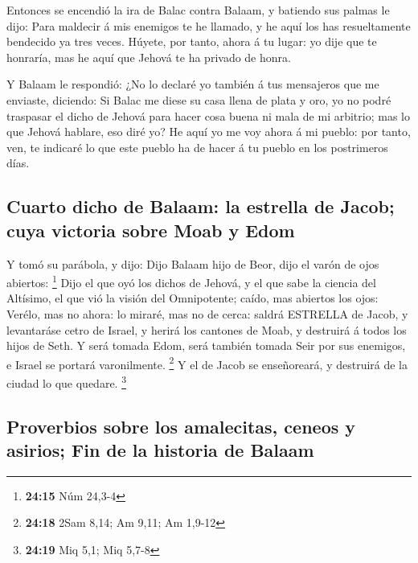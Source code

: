  Entonces se encendió la ira de Balac contra Balaam, y
batiendo sus palmas le dijo: Para maldecir á mis enemigos te he llamado,
y he aquí los has resueltamente bendecido ya tres veces. 
Húyete, por tanto, ahora á tu lugar: yo dije que te honraría, mas he
aquí que Jehová te ha privado de honra.

 Y Balaam le respondió: ¿No lo declaré yo también á tus
mensajeros que me enviaste, diciendo:  Si Balac me diese
su casa llena de plata y oro, yo no podré traspasar el dicho de Jehová
para hacer cosa buena ni mala de mi arbitrio; mas lo que Jehová hablare,
eso diré yo?  He aquí yo me voy ahora á mi pueblo: por
tanto, ven, te indicaré lo que este pueblo ha de hacer á tu pueblo en
los postrimeros días.

\hypertarget{cuarto-dicho-de-balaam-la-estrella-de-jacob-cuya-victoria-sobre-moab-y-edom}{%
\subsection{Cuarto dicho de Balaam: la estrella de Jacob; cuya victoria
sobre Moab y
Edom}\label{cuarto-dicho-de-balaam-la-estrella-de-jacob-cuya-victoria-sobre-moab-y-edom}}

 Y tomó su parábola, y dijo: Dijo Balaam hijo de Beor,
dijo el varón de ojos abiertos: \footnote{\textbf{24:15} Núm 24,3-4}
 Dijo el que oyó los dichos de Jehová, y el que sabe la
ciencia del Altísimo, el que vió la visión del Omnipotente; caído, mas
abiertos los ojos:  Verélo, mas no ahora: lo miraré, mas
no de cerca: saldrá ESTRELLA de Jacob, y levantaráse cetro de Israel, y
herirá los cantones de Moab, y destruirá á todos los hijos de Seth.
 Y será tomada Edom, será también tomada Seir por sus
enemigos, e Israel se portará varonilmente. \footnote{\textbf{24:18}
  2Sam 8,14; Am 9,11; Am 1,9-12}  Y el de Jacob se
enseñoreará, y destruirá de la ciudad lo que quedare. \footnote{\textbf{24:19}
  Miq 5,1; Miq 5,7-8}

\hypertarget{proverbios-sobre-los-amalecitas-ceneos-y-asirios-fin-de-la-historia-de-balaam}{%
\subsection{Proverbios sobre los amalecitas, ceneos y asirios; Fin de la
historia de
Balaam}\label{proverbios-sobre-los-amalecitas-ceneos-y-asirios-fin-de-la-historia-de-balaam}}

